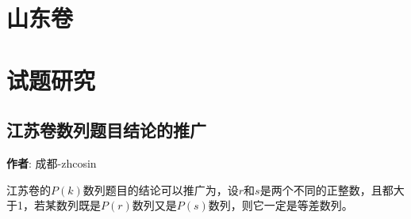 \documentclass{ctexart}
\begin{document}
\section{山东卷}
\label{sec:shandong}

\section{试题研究}
\label{sec:problem-study}

\subsection{江苏卷数列题目结论的推广}
\label{sec:jiangshu-series-extend}

\textbf{作者}: 成都-zhcosin

江苏卷的$P(k)$数列题目的结论可以推广为，设$r$和$s$是两个不同的正整数，且都大于1，若某数列既是$P(r)$数列又是$P(s)$数列，则它一定是等差数列。
\end{document}
